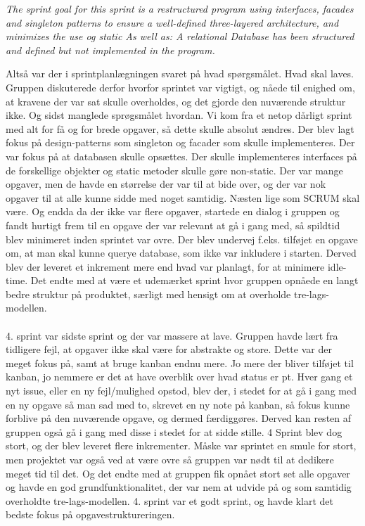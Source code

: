 \textit{The sprint goal for this sprint is a restructured program using interfaces, facades and singleton patterns to ensure a well-defined three-layered architecture, and minimizes the use og static
As well as:
A relational Database has been structured and defined but not implemented in the program.}

Altså var der i sprintplanlægningen svaret på hvad spørgsmålet. Hvad skal laves. Gruppen diskuterede derfor hvorfor sprintet var vigtigt, og nåede til enighed om, at kravene der var sat skulle overholdes, og det gjorde den nuværende struktur ikke. Og sidst manglede sprøgsmålet hvordan. Vi kom fra et netop dårligt sprint med alt for få og for brede opgaver, så dette skulle absolut ændres. Der blev lagt fokus på design-patterns som singleton og facader som skulle implementeres. Der var fokus på at databasen skulle opsættes. Der skulle implementeres interfaces på de forskellige objekter og static metoder skulle gøre non-static. Der var mange opgaver, men de havde en størrelse der var til at bide over, og der var nok opgaver til at alle kunne sidde med noget samtidig. Næsten lige som SCRUM skal være. Og endda da der ikke var flere opgaver, startede en dialog i gruppen og fandt hurtigt frem til en opgave der var relevant at gå i gang med, så spildtid blev minimeret inden sprintet var ovre. Der blev undervej f.eks. tilføjet en opgave om, at man skal kunne querye database, som ikke var inkludere i starten. Derved blev der leveret et inkrement mere end hvad var planlagt, for at minimere idle-time. Det endte med at være et udemærket sprint hvor gruppen opnåede en langt bedre struktur på produktet, særligt med hensigt om at overholde tre-lags-modellen.\\\\
4. sprint var sidste sprint og der var massere at lave. Gruppen havde lært fra tidligere fejl, at opgaver ikke skal være for abstrakte og store. Dette var der meget fokus på, samt at bruge kanban endnu mere. Jo mere der bliver tilføjet til kanban, jo nemmere er det at have overblik over hvad status er pt. Hver gang et nyt issue, eller en ny fejl/mulighed opstod, blev der, i stedet for at gå i gang med en ny opgave så man sad med to, skrevet en ny note på kanban, så fokus kunne forblive på den nuværende opgave, og dermed færdiggøres. Derved kan resten af gruppen også gå i gang med disse i stedet for at sidde stille. 4 Sprint blev dog stort, og der blev leveret flere inkrementer. Måske var sprintet en smule for stort, men projektet var også ved at være ovre så gruppen var nødt til at dedikere meget tid til det. Og det endte med at gruppen fik opnået stort set alle opgaver og havde en god grundfunktionalitet, der var nem at udvide på og som samtidig overholdte tre-lags-modellen. 4. sprint var et godt sprint, og havde klart det bedste fokus på opgavestruktureringen.
